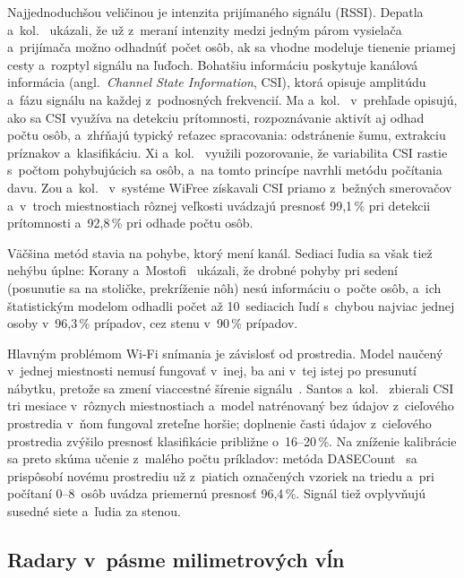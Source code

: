 \documentclass[10pt,twoside,a4paper]{article}
\begin{document}
Najjednoduchšou veličinou je intenzita prijímaného signálu (RSSI). Depatla a~kol.~\cite{depatla2015occupancy} ukázali, že už z~meraní intenzity medzi jedným párom vysielača a~prijímača možno odhadnúť počet osôb, ak sa vhodne modeluje tienenie priamej cesty a~rozptyl signálu na ľuďoch. Bohatšiu informáciu poskytuje kanálová informácia (angl.~\emph{Channel State Information}, CSI), ktorá opisuje amplitúdu a~fázu signálu na každej z~podnosných frekvencií. Ma a~kol.~\cite{ma2019wifi} v~prehľade opisujú, ako sa CSI využíva na detekciu prítomnosti, rozpoznávanie aktivít aj odhad počtu osôb, a~zhŕňajú typický reťazec spracovania: odstránenie šumu, extrakciu príznakov a~klasifikáciu. Xi a~kol.~\cite{xi2014frog} využili pozorovanie, že variabilita CSI rastie s~počtom pohybujúcich sa osôb, a~na tomto princípe navrhli metódu počítania davu. Zou a~kol.~\cite{zou2018wifree} v~systéme WiFree získavali CSI priamo z~bežných smerovačov a~v~troch miestnostiach rôznej veľkosti uvádzajú presnosť 99,1\,\% pri detekcii prítomnosti a~92,8\,\% pri odhade počtu osôb.

Väčšina metód stavia na pohybe, ktorý mení kanál. Sediaci ľudia sa však tiež nehýbu úplne: Korany a~Mostofi~\cite{korany2021stationary} ukázali, že drobné pohyby pri sedení (posunutie sa na stoličke, prekríženie nôh) nesú informáciu o~počte osôb, a~ich štatistickým modelom odhadli počet až 10~sediacich ľudí s~chybou najviac jednej osoby v~96,3\,\% prípadov, cez stenu v~90\,\% prípadov.

Hlavným problémom Wi-Fi snímania je závislosť od prostredia. Model naučený v~jednej miestnosti nemusí fungovať v~inej, ba ani v~tej istej po presunutí nábytku, pretože sa zmení viaccestné šírenie signálu~\cite{ma2019wifi}. Santos a~kol.~\cite{santos2024environment} zbierali CSI tri mesiace v~rôznych miestnostiach a~model natrénovaný bez údajov z~cieľového prostredia v~ňom fungoval zreteľne horšie; doplnenie časti údajov z~cieľového prostredia zvýšilo presnosť klasifikácie približne o~16--20\,\%. Na zníženie kalibrácie sa preto skúma učenie z~malého počtu príkladov: metóda DASECount~\cite{hou2023dasecount} sa prispôsobí novému prostrediu už z~piatich označených vzoriek na triedu a~pri počítaní 0--8~osôb uvádza priemernú presnosť 96,4\,\%. Signál tiež ovplyvňujú susedné siete a~ľudia za stenou.

\subsection{Radary v~pásme milimetrových vĺn}
\end{document}
